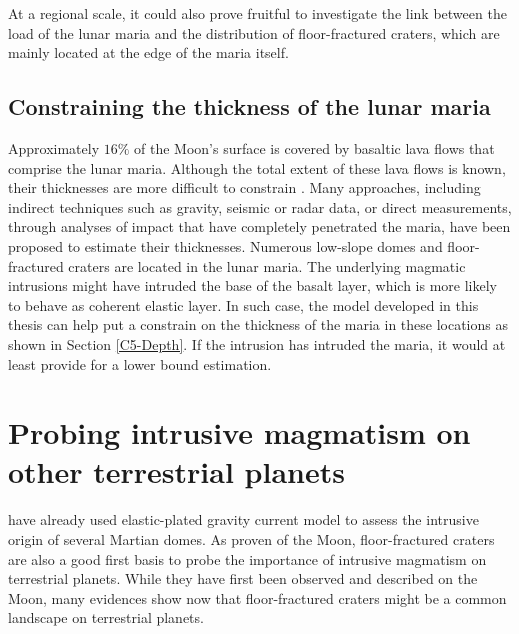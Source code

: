At a regional  scale, it could also prove fruitful  to investigate the
link  between the  load of  the lunar  maria and  the distribution  of
floor-fractured craters, which  are mainly located at the  edge of the
maria itself.

\subsection{Constraining the thickness of the lunar maria}
\label{sec:thickn-lunar-maria}

Approximately $16\%$ of the Moon's surface is covered by basaltic lava
flows  that comprise  the lunar  maria. Although  the total  extent of
these lava  flows is  known, their thicknesses  are more  difficult to
constrain \citep{Thomson:2009eo}. Many  approaches, including indirect
techniques  such  as  gravity,  seismic   or  radar  data,  or  direct
measurements,  through   analyses  of  impact  that   have  completely
penetrated   the  maria,   have  been   proposed  to   estimate  their
thicknesses. Numerous low-slope domes  and floor-fractured craters are
located in the lunar maria.   The underlying magmatic intrusions might
have intruded  the base of the  basalt layer, which is  more likely to
behave as coherent elastic layer. In such case, the model developed in
this thesis can help put a constrain  on the thickness of the maria in
these locations as shown in  Section \ref{C5-Depth}.  If the intrusion
has intruded  the maria, it would  at least provide for  a lower bound
estimation.

\section{Probing intrusive magmatism on other terrestrial planets}
\label{sec:other-terr-plan}

\citet{Michaut:2013dr}  have   already  used   elastic-plated  gravity
current  model  to assess  the  intrusive  origin of  several  Martian
domes. As proven of the Moon,  floor-fractured craters are also a good
first  basis  to  probe  the  importance  of  intrusive  magmatism  on
terrestrial planets. While they have first been observed and described
on  the Moon,  many evidences  show now  that floor-fractured  craters
might be a common landscape on terrestrial planets.

